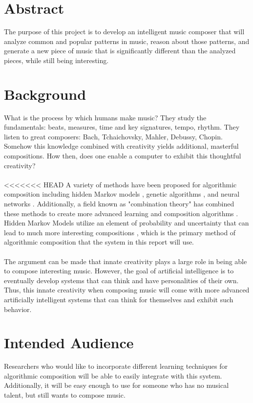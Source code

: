 \documentclass{article}
\begin{document}
\printglossary[title=Terms and Abbreviations,toctile=Terms and Abbreviations]
\newpage

\section{Abstract}
The purpose of this project is to develop an intelligent music composer that will analyze common and popular patterns in music, reason about those patterns, and generate a new piece of music that is significantly different than the analyzed pieces, while still being interesting.

\section{Background}
What is the process by which humans make music? They study the fundamentals: beats, measures, time and key signatures, tempo, rhythm. They listen to great composers: Bach, Tchaichovsky, Mahler, Debussy, Chopin. Somehow this knowledge combined with creativity yields additional, masterful compositions. How then, does one enable a computer to exhibit this thoughtful creativity?\\
\\
<<<<<<< HEAD
A variety of methods have been proposed for algorithmic composition including hidden Markov models \cite{5492670}, genetic algorithms \cite{514161}, and neural networks \cite{4667040}. Additionally, a field known as "combination theory" has combined these methods to create more advanced learning and composition algorithms \cite{4626654}. Hidden Markov Models utilize an element of probability and uncertainty that can lead to much more interesting compositions
\cite{5492670}, which is the primary method of algorithmic composition that the system in this report will use.\\
\\
The argument can be made that innate creativity plays a large role in being able to compose interesting music.  However, the goal of artificial intelligence is to eventually develop systems that can think and have personalities of their own.  Thus, this innate creativity when composing music will come with more advanced artificially intelligent systems that can think for themselves and exhibit such behavior.

\section{Intended Audience}
Researchers who would like to incorporate different learning techniques for algorithmic composition will be able to easily integrate with this system. Additionally, it will be easy enough to use for someone who has no musical talent, but still wants to compose music.
\end{document}
